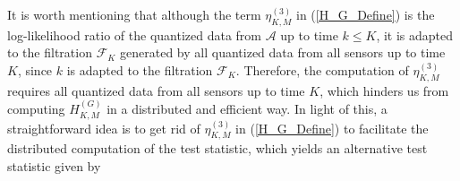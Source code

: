\documentclass[11pt, draftclsnofoot, onecolumn]{IEEEtran}
\newcommand{\cF}{\mathcal{F}}
\newcommand{\cA}{\mathcal{A}}
\begin{document}
It is worth mentioning that although the term $\eta _{K,M}^{(3)}$ in (\ref{H_G_Define}) is the log-likelihood ratio of the quantized data from $\cA$ up to time $k \le K$, it is adapted to the filtration $\cF_K$ generated by all quantized data from all sensors up to time $K$, since $k$ is adapted to the filtration $\cF_K$. Therefore, the computation of  $\eta _{K,M}^{(3)}$ requires all  quantized data from all sensors up to time $K$, which hinders us from  computing $H_{K,M}^{\left( G \right)}$ in a distributed and efficient way. In light of this, a straightforward idea is to get rid of $\eta _{K,M}^{(3)}$ in (\ref{H_G_Define}) to facilitate the distributed computation of the test statistic, which yields an alternative test statistic given by
%
%
\end{document}
